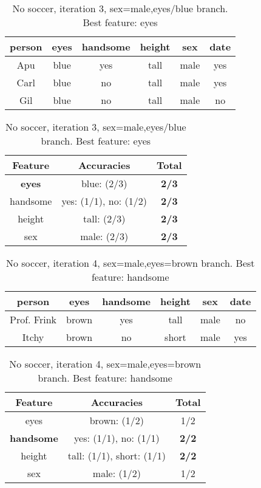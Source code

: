 \begin{table}[h!]
  \centering
  \begin{tabular}{ccccc|c}
    \toprule
    person      & eyes  & handsome & height & sex    & date\\
    \midrule
    Apu         & blue  & yes      & tall   & male   & yes \\
    Carl        & blue  & no       & tall   & male   & yes \\
    Gil         & blue  & no       & tall   & male   & no  \\
    \bottomrule
  \end{tabular}

  \vspace{.5cm}

  \begin{tabular}{ccc}
    \toprule
    Feature       & Accuracies            & Total\\
    \midrule
    \textbf{eyes} & blue: (2/3)           & \textbf{2/3}\\
    handsome      & yes: (1/1), no: (1/2) & \textbf{2/3}\\
    height        & tall: (2/3)           & \textbf{2/3}\\
    sex           & male: (2/3)           & \textbf{2/3}\\
    \bottomrule
  \end{tabular}
  \caption*{No soccer, iteration 3, sex=male,eyes/blue branch. Best feature: eyes}
\end{table}

\begin{table}[h!]
  \centering
  \begin{tabular}{ccccc|c}
    \toprule
    person      & eyes  & handsome & height & sex    & date\\
    \midrule
    Prof. Frink & brown & yes      & tall   & male   & no  \\
    Itchy       & brown & no       & short  & male   & yes \\
    \bottomrule
  \end{tabular}

  \vspace{.5cm}

  \begin{tabular}{ccc}
    \toprule
    Feature           & Accuracies                              & Total\\
    \midrule
    eyes              & brown: (1/2)                            & 1/2\\
    \textbf{handsome} & yes: (1/1), no: (1/1)                   & \textbf{2/2}\\
    height            & tall: (1/1), short: (1/1)               & \textbf{2/2}\\
    sex               & male: (1/2)                             & 1/2\\
    \bottomrule
  \end{tabular}
  \caption*{No soccer, iteration 4, sex=male,eyes=brown branch. Best feature: handsome}
\end{table}

